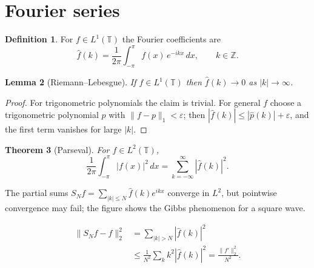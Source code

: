 \documentclass[11pt]{article}
\newtheorem{theorem}{Theorem}
\newtheorem{lemma}[theorem]{Lemma}
\theoremstyle{definition}
\newtheorem{definition}[theorem]{Definition}
\begin{document}
\section{Fourier series}
\begin{definition}
For $f \in L^1(\mathbb{T})$ the Fourier coefficients are
\[
  \hat f(k) = \frac{1}{2\pi} \int_{-\pi}^{\pi} f(x)\, e^{-ikx}\, dx, \qquad k \in \mathbb{Z}.
\]
\end{definition}
\begin{lemma}[Riemann--Lebesgue]
If $f \in L^1(\mathbb{T})$ then $\hat f(k) \to 0$ as $|k| \to \infty$.
\end{lemma}
\begin{proof}
For trigonometric polynomials the claim is trivial. For general $f$ choose a trigonometric
polynomial $p$ with $\|f - p\|_1 < \varepsilon$; then $|\hat f(k)| \le |\hat p(k)| + \varepsilon$,
and the first term vanishes for large $|k|$.
\end{proof}
\begin{theorem}[Parseval]
For $f \in L^2(\mathbb{T})$,
\begin{equation}
  \frac{1}{2\pi}\int_{-\pi}^{\pi} |f(x)|^2\,dx = \sum_{k=-\infty}^{\infty} |\hat f(k)|^2 .
\end{equation}
\end{theorem}
The partial sums $S_N f = \sum_{|k|\le N} \hat f(k) e^{ikx}$ converge in $L^2$, but pointwise
convergence may fail; the figure shows the Gibbs phenomenon for a square wave.
\begin{center}
\end{center}
\begin{align}
  \|S_N f - f\|_2^2 &= \sum_{|k| > N} |\hat f(k)|^2 \\
                    &\le \frac{1}{N^2} \sum_{k} k^2 |\hat f(k)|^2 = \frac{\|f'\|_2^2}{N^2}.
\end{align}
\end{document}

